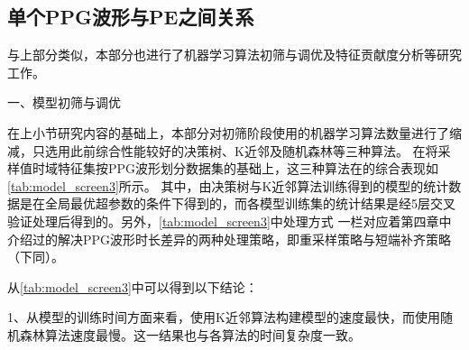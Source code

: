 \subsection{单个PPG波形与PE之间关系}
与上部分类似，本部分也进行了机器学习算法初筛与调优及特征贡献度分析等研究工作。

一、模型初筛与调优

在上小节研究内容的基础上，本部分对初筛阶段使用的机器学习算法数量进行了缩减，只选用此前综合性能较好的决策树、K近邻及随机森林等三种算法。
在将采样值时域特征集按PPG波形划分数据集的基础上，这三种算法在的综合表现如\autoref{tab:model_screen3}所示。
其中，由决策树与K近邻算法训练得到的模型的统计数据是在全局最优超参数的条件下得到的，而各模型训练集的统计结果是经5层交叉验证处理后得到的。另外，\autoref{tab:model_screen3}中处理方式
一栏对应着第四章中介绍过的解决PPG波形时长差异的两种处理策略，即重采样策略与短端补齐策略（下同）。

从\autoref{tab:model_screen3}中可以得到以下结论：

1、从模型的训练时间方面来看，使用K近邻算法构建模型的速度最快，而使用随机森林算法速度最慢。这一结果也与各算法的时间复杂度一致。

